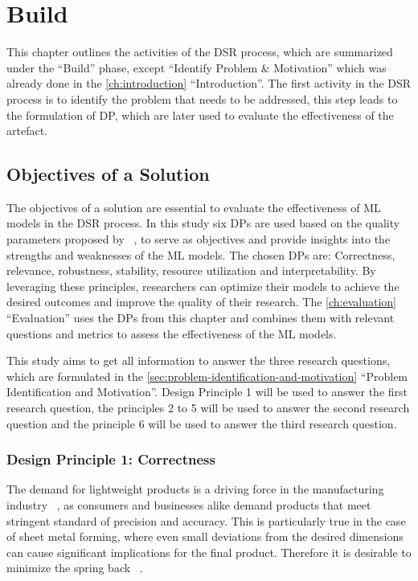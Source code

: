 \chapter{Build}\label{ch:build}
This chapter outlines the activities of the \ac{DSR} process, which are
summarized under the ``Build'' phase, except ``Identify Problem \& Motivation'' which was already done in the
\cref{ch:introduction} ``Introduction''.
The first activity in the DSR process is to identify the problem that needs to be addressed,
this step leads to the formulation of \ac{DP}, which are later used to evaluate
the effectiveness of the artefact.


\section{Objectives of a Solution}\label{sec:objectives-of-a-solution}

The objectives of a solution are essential to evaluate the effectiveness of ML models in the
DSR process.
In this study six DPs are used based on the quality parameters proposed by
~\cite{siebert2022construction}, to serve as objectives and provide insights into the strengths and weaknesses of the
ML models.
The chosen \ac{DP}s are: Correctness, relevance, robustness, stability, resource utilization and interpretability.
By leveraging these principles, researchers can optimize their models to achieve the desired outcomes and improve the
quality of their research.
The \cref{ch:evaluation} ``Evaluation'' uses the DPs from this chapter and combines them with relevant
questions and metrics to assess the effectiveness of the ML models.

This study aims to get all information to answer the three research questions, which are formulated in the
\cref{sec:problem-identification-and-motivation} ``Problem Identification and Motivation''.
Design Principle 1 will be used to answer the first research question, the principles 2 to 5 will be used to answer the
second research question and the principle 6 will be used to answer the third research question.


\subsection*{Design Principle 1: Correctness}\label{subsec:correctness}

The demand for lightweight products is a driving force in the manufacturing industry
~\cite[p. 1]{zheng_reviewformingtechniques_2018},
as consumers and businesses alike demand products that meet stringent standard of
precision and accuracy.
This is particularly true in the case of sheet metal forming, where even small
deviations from the desired dimensions can cause significant implications for the final
product.
Therefore it is desirable to minimize the spring back
~\cite[p.1]{cruz2021application}.

